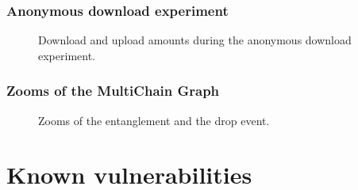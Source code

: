 \documentclass{beamer}
\begin{document}
\begin{frame}
\frametitle{Anonymous download experiment}

\begin{figure}
    \centering
    \begin{adjustwidth}{-3em}{-3em}
    \hspace{0em}%
    \end{adjustwidth}
    \caption{Download and upload amounts during the anonymous download experiment.}
\end{figure}

\end{frame}

\begin{frame}
\frametitle{Zooms of the MultiChain Graph}
\begin{figure}
    \centering
    \begin{adjustwidth}{-3em}{-3em}
    \hspace{0em}%
    \pause{}
    \end{adjustwidth}
    \caption{Zooms of the entanglement and the drop event.}
\end{figure}
\end{frame}

\section{Known vulnerabilities}
\end{document}
